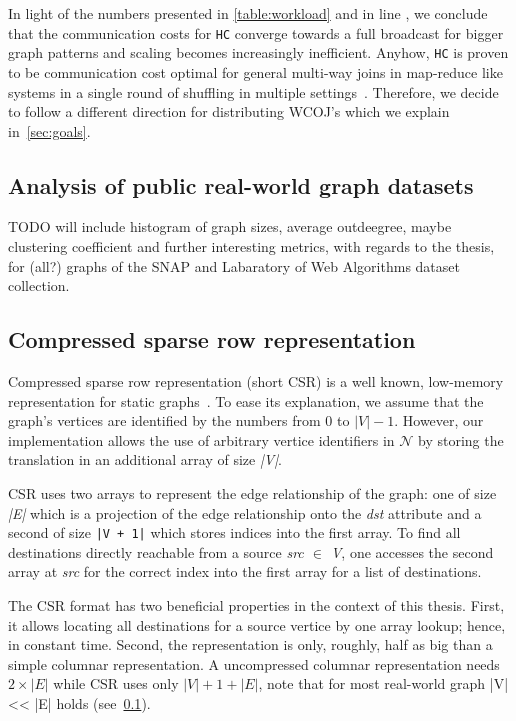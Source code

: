 In light of the numbers presented in \cref{table:workload} and in line \cite{ammar2018distributed}, we conclude that the communication costs for \texttt{HC} converge towards a full broadcast for bigger graph patterns and scaling becomes increasingly inefficient.
Anyhow, \texttt{HC} is proven to be communication cost optimal for general multi-way joins in map-reduce like systems in a single round of shuffling in multiple settings~\cite{beame2013,beame2014,beame2016}.
Therefore, we decide to follow a different direction for distributing WCOJ's which we explain in~\cref{sec:goals}.


\subsection{Analysis of public real-world graph datasets}\label{subsec:graph-analysis}
TODO will include histogram of graph sizes, average outdeegree, maybe clustering coefficient and further interesting metrics, with
regards to the thesis, for (all?) graphs of the SNAP and Labaratory of Web Algorithms dataset collection.

\subsection{Compressed sparse row representation}\label{subsec:csr-background}
Compressed sparse row representation (short CSR) is a well known, low-memory representation for static graphs~\cite{csr,csr-first}.
To ease its explanation, we assume that the graph's vertices are identified by the numbers from 0 to $|V| - 1$.
However, our implementation allows the use of arbitrary vertice identifiers in $\mathcal{N}$ by storing the translation in an additional
array of size \textit{|V|}.

CSR uses two arrays to represent the edge relationship of the graph: one of size \textit{|E|} which is a projection of the edge relationship
onto the \textit{dst} attribute and a second of size \texttt{|V + 1|} which stores indices into the first array.
To find all destinations directly reachable from a source \textit{src $\in$ V}, one accesses the second array at \textit{src} for the
correct index into the first array for a list of destinations.

The CSR format has two beneficial properties in the context of this thesis.
First, it allows locating all destinations for a source vertice by one array lookup;
hence, in constant time.
Second, the representation is only, roughly, half as big than a simple columnar representation.
A uncompressed columnar representation needs $2 \times |E|$ while CSR uses only $|V| + 1 + |E|$, note that for most real-world graph |V|
<< |E| holds (see~\cref{subsec:graph-analysis}).
